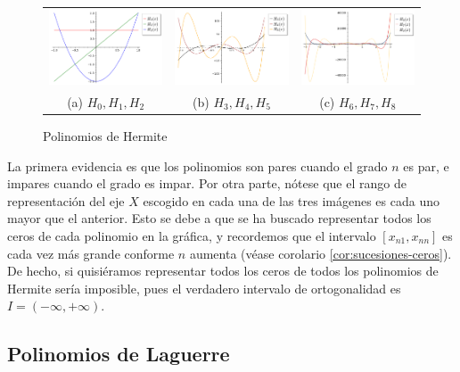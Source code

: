 \begin{figure}[h]
    \centering
    \begin{tabular}{ccc}
        \includegraphics[width=5cm]{img/C2/Hermite1.png} & 
        \includegraphics[width=5cm]{img/C2/Hermite2.png} &
        \includegraphics[width=5cm]{img/C2/Hermite3.png} \\
        (a) $H_0, H_1, H_2$ & (b) $H_3, H_4, H_5$ & (c) $H_6, H_7, H_8$ 
    \end{tabular}
    \caption{Polinomios de Hermite}
    \label{img:graficas-Hermite}
\end{figure}

La primera evidencia es que los polinomios son pares cuando el grado $n$ es par, e impares cuando el grado es impar. Por otra parte, nótese que el rango de representación del eje $X$ escogido en cada una de las tres imágenes es cada uno mayor que el anterior. Esto se debe a que se ha buscado representar todos los ceros de cada polinomio en la gráfica, y recordemos que el intervalo $[x_{n1},x_{nn}]$ es cada vez más grande conforme $n$ aumenta (véase corolario \ref{cor:sucesiones-ceros}). De hecho, si quisiéramos representar todos los ceros de todos los polinomios de Hermite sería imposible, pues el verdadero intervalo de ortogonalidad es $I=(-\infty,+\infty)$.

\subsection{Polinomios de Laguerre}

